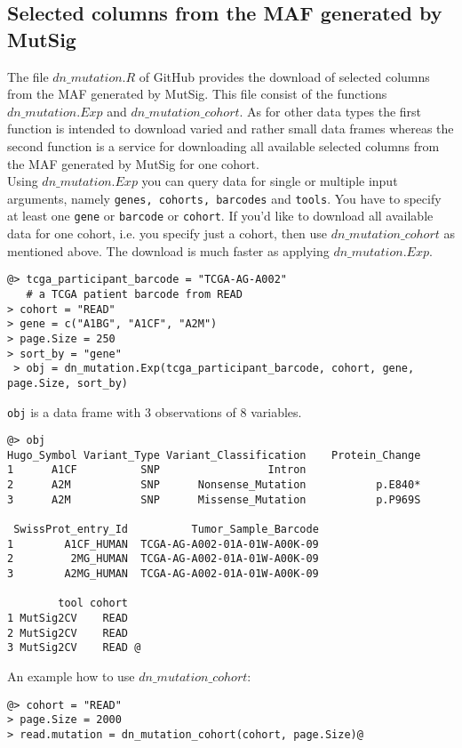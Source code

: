 \documentclass{TechReport}
\begin{document}
 
 

\subsection{Selected columns from the MAF generated by MutSig}
The file $dn\_mutation.R$ of GitHub provides the download of selected columns from
the MAF generated by MutSig. This file consist of the functions 
$dn\_mutation.Exp$ and $dn\_mutation\_cohort$. As for other data types the first
function is intended to download varied and rather small data frames 
whereas the second function is a service for downloading all available selected
columns from the MAF generated by MutSig for one cohort.\\
Using $dn\_mutation.Exp$ you can query data for single or multiple input arguments,
namely {\tt genes, cohorts, barcodes} and {\tt tools}. You 
have to specify at least one {\tt gene} or {\tt barcode} or {\tt cohort}. If you'd
like to download all available data for one 
cohort, i.e. you specify just a cohort, then use $dn\_mutation\_cohort$ as mentioned
above. The download is much faster as applying 
$dn\_mutation.Exp$.
\begin{lstlisting}[style=base]
@> tcga_participant_barcode = "TCGA-AG-A002"
   # a TCGA patient barcode from READ
> cohort = "READ"
> gene = c("A1BG", "A1CF", "A2M")
> page.Size = 250
> sort_by = "gene"
 > obj = dn_mutation.Exp(tcga_participant_barcode, cohort, gene, 
page.Size, sort_by)
\end{lstlisting}
{\tt obj} is a data frame with 3 observations of 8 variables.
\begin{lstlisting}[style=base]
@> obj
Hugo_Symbol Variant_Type Variant_Classification    Protein_Change 
1      A1CF          SNP                 Intron                        
2      A2M           SNP      Nonsense_Mutation           p.E840*         
3      A2M           SNP      Missense_Mutation           p.P969S   

 SwissProt_entry_Id          Tumor_Sample_Barcode       
1        A1CF_HUMAN  TCGA-AG-A002-01A-01W-A00K-09  
2         2MG_HUMAN  TCGA-AG-A002-01A-01W-A00K-09  
3        A2MG_HUMAN  TCGA-AG-A002-01A-01W-A00K-09  

        tool cohort
1 MutSig2CV    READ
2 MutSig2CV    READ
3 MutSig2CV    READ @
\end{lstlisting}
An example how to use $dn\_mutation\_cohort$:
\begin{lstlisting}[style=base]
@> cohort = "READ"
> page.Size = 2000
> read.mutation = dn_mutation_cohort(cohort, page.Size)@
\end{lstlisting}
\end{document}
